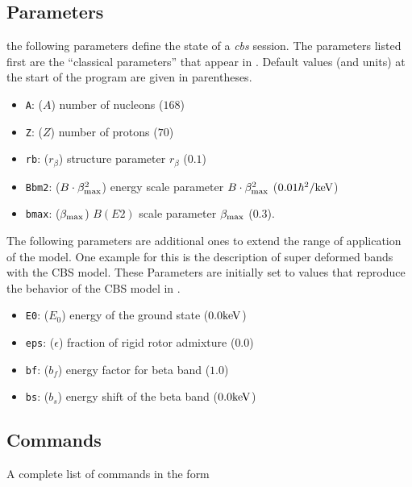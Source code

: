 \documentclass[10pt,a4paper]{article}
\begin{document}
\subsection{Parameters}
the following parameters define the state of a \textit{cbs} session. The parameters listed first are the ``classical parameters'' that appear in \cite{Pietralla}. Default values (and units) at the start of the program are given in parentheses.
\begin{itemize}
\item \verb!A!: ($A$) number of nucleons ($168$)
\item \verb!Z!: ($Z$) number of protons ($70$)
\item \verb!rb!: ($r_{\beta}$) structure parameter $r_{\beta}$ ($0.1$)
\item \verb!Bbm2!: ($B\cdot\beta_{\rm max}^2$) energy scale parameter $B\cdot\beta_{\rm max}^2$ ($0.01 \hbar^2/{\rm keV}$)
\item \verb!bmax!: ($\beta_{\rm max}$) $B(E2)$ scale parameter $\beta_{\rm max}$ ($0.3$).
\end{itemize}
The following parameters are additional ones to extend the range of application of the model. One example for this is the description of super deformed bands with the CBS model. These Parameters are initially set to values that reproduce the behavior of the CBS model in \cite{Pietralla}.
\begin{itemize}
\item \verb!E0!: ($E_0$) energy of the ground state ($0.0 {\rm keV}$)
\item \verb!eps!: ($\epsilon$) fraction of rigid rotor admixture ($0.0$)
\item \verb!bf!: ($b_f$) energy factor for beta band ($1.0$)
\item \verb!bs!: ($b_s$) energy shift of the beta band ($0.0 {\rm keV}$)
\end{itemize}
\subsection{Commands}
A complete list of commands in the form 
\end{document}
